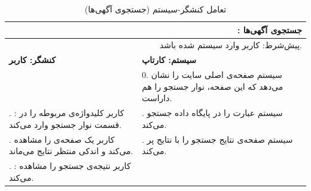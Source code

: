 \documentclass[12pt,svgnames,oneside]{book}
\newcommand{\uc}[1]{\lr{UC{#1}}}
\newcommand{\tucbw}{\lr{TUCBW}}
\newcommand{\tucew}{\lr{TUCEW}}
\newcommand{\actorsystem}[1]{
\textbf{کنشگر: {#1}} &
\textbf{سیستم: کارتاپ} \\
}
\newcommand{\zerostep}[1]{
& 0. {#1} \\
}
\newcounter{UseCaseCounter}
\newcommand{\step}[1]{
\stepcounter{UseCaseCounter}\arabic{UseCaseCounter}. {#1}
}
\newcommand{\ucname}[2]{
\multicolumn{2}{|r|}{\uc{{#1}}: {#2}} \\
}
\newcommand{\preif}[1]{
\multicolumn{2}{|r|}{پیش‌شرط:‌ {#1}} \\
}
\begin{document}
\setcounter{UseCaseCounter}{0}
\begin{table}[H]
\caption{تعامل کنشگر-سیستم  (‌جستجوی آگهی‌ها)}
\label{table:uc:apply-search}
\begin{center}
\begin{tabular}{|p{}|p{}|}
\hline

\ucname{23}{جستجوی آگهی‌ها}
\hline

\preif{کاربر وارد سیستم شده باشد.}
\hline

\actorsystem{کاربر}
\hline

\zerostep{{\small سیستم صفحه‌‌ی اصلی سایت را نشان می‌دهد که این صفحه، نوار جستجو را هم داراست.}}
\hline

\step{{\small \textbf{\tucbw}: کاربر کلید‌واژه‌ی مربوطه را در قسمت نوار جستجو وارد می‌کند.}} & 
\step{{\small سیستم عبارت را در پایگاه داده جستجو می‌کند.}} \\
\hline

\step{{\small کاربر یک صفحه‌ی \lr{preload} را مشاهده می‌کند و اندکی منتظر نتایج می‌ماند.}} &
\step{{\small سیستم صفحه‌ی نتایج جستجو را با نتایج پر می‌کند.}} \\
\hline

\step{{\small \textbf{\tucew}: کاربر نتیجه‌ی جستجو را مشاهده می‌کند.}} & 
\\
\hline

\end{tabular}
\end{center}
\end{table}
\end{document}
